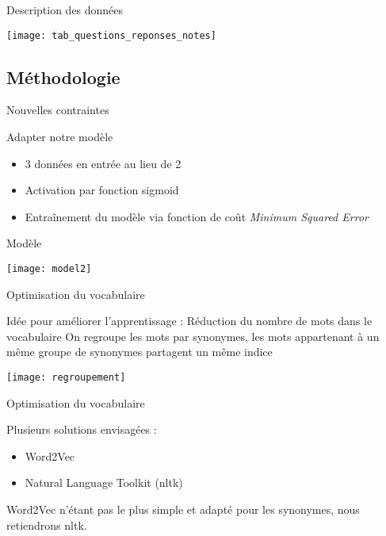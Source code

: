 \documentclass{beamer}
\theoremstyle{definition}
\begin{document}
\begin{frame}{Description des données}

\center\texttt{[image: tab\_questions\_reponses\_notes]}

\end{frame}

\subsection{Méthodologie}

\begin{frame}{Nouvelles contraintes}

Adapter notre modèle
\begin{itemize}
\item 3 données en entrée au lieu de 2
\item Activation par fonction sigmoid
\item Entraînement du modèle via fonction de coût \textit{Minimum Squared Error}
\end{itemize}

\end{frame}

\begin{frame}{Modèle}

\center\texttt{[image: model2]}

\end{frame}

\begin{frame}{Optimisation du vocabulaire}

Idée pour améliorer l'apprentissage : Réduction du nombre de mots dans le vocabulaire
\vspace{0.5cm}
On regroupe les mots par synonymes, les mots appartenant à un même groupe de synonymes partagent un même indice

\center\texttt{[image: regroupement]}

\end{frame}

\begin{frame}{Optimisation du vocabulaire}

Plusieurs solutions envisagées :
\begin{itemize}
\item Word2Vec
\item Natural Language Toolkit (nltk)
\end{itemize}
\vspace{0.5cm}

Word2Vec n'étant pas le plus simple et adapté pour les synonymes, nous retiendrons nltk.
    
\end{frame}
\end{document}
